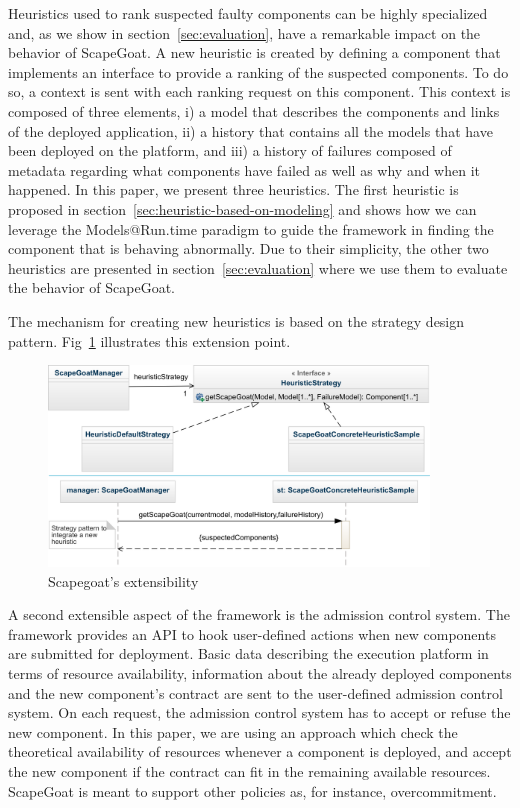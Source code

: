 Heuristics used to rank suspected faulty components can be highly specialized
and, as we show in section~\ref{sec:evaluation}, have a remarkable impact on the behavior of ScapeGoat.
A new heuristic is created by defining a component that implements an interface to provide a ranking of the suspected components.
To do so, a context is sent with each ranking request on this component.
This context is composed of three elements, 
i) a model that describes the components and links of the deployed application, 
ii) a history that contains all the models that have been deployed on the platform, and 
iii) a history of failures composed of metadata regarding what components have failed as well as why and when it happened.
In this paper, we present three heuristics.
The first heuristic is proposed in section~\ref{sec:heuristic-based-on-modeling} and shows how we can leverage the Models@Run.time paradigm to guide the framework in finding the component that is behaving abnormally.
Due to their simplicity, the other two heuristics are presented in section~\ref{sec:evaluation} where we use them to evaluate the behavior of ScapeGoat.

The mechanism for creating new heuristics is based on the strategy design pattern. Fig~\ref{fig:strategy} illustrates this extension point. 

\begin{figure}[!h]
\centering
\includegraphics[width=0.9\textwidth]{chapter5/figures/strategy}
\caption{\label{fig:strategy}Scapegoat's extensibility}
\end{figure}

A second extensible aspect of the framework is the admission control system.
The framework provides an API to hook user-defined actions when new components are submitted for deployment.
Basic data describing the execution platform in terms of resource availability, information about the already deployed components and the new component's contract are sent to the user-defined admission control system.
On each request, the admission control system has to accept or refuse the new component.
In this paper, we are using an approach which check the theoretical availability of resources whenever a component is deployed, and accept the new component if the contract can fit in the remaining available resources.
ScapeGoat is meant to support other policies as, for instance, overcommitment.
 
